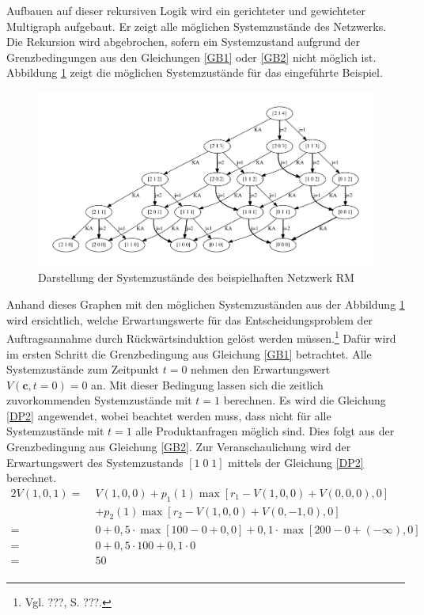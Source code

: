 Aufbauen auf dieser rekursiven Logik wird ein gerichteter und gewichteter Multigraph aufgebaut. Er zeigt alle möglichen Systemzustände des Netzwerks. Die Rekursion wird abgebrochen, sofern ein Systemzustand aufgrund der Grenzbedingungen aus den Gleichungen \eqref{GB1} oder \eqref{GB2} nicht möglich ist. Abbildung \ref{B1} zeigt die möglichen Systemzustände für das eingeführte Beispiel.
\begin{figure}[h!]
  \begin{center}
    \includegraphics[width=150mm]{Bilder/Beispiel1.pdf}
    \caption{Darstellung der Systemzustände des beispielhaften Netzwerk RM}  \label{B1}
  \end{center}
\end{figure}

Anhand dieses Graphen mit den möglichen Systemzuständen aus der Abbildung \ref{B1} wird ersichtlich, welche Erwartungswerte für das Entscheidungsproblem der Auftragsannahme durch Rückwärtsinduktion gelöst werden müssen.\footnote{Vgl. ???, S. ???.} Dafür wird im ersten Schritt die Grenzbedingung aus Gleichung \eqref{GB1} betrachtet. Alle Systemzustände zum Zeitpunkt $t=0$ nehmen den Erwartungswert $V(\textbf{c}, t=0)=0$ an. Mit dieser Bedingung lassen sich die zeitlich zuvorkommenden Systemzustände mit $t=1$ berechnen. Es wird die Gleichung \eqref{DP2} angewendet, wobei beachtet werden muss, dass nicht für alle Systemzustände mit $t=1$ alle Produktanfragen möglich sind. Dies folgt aus der Grenzbedingung aus Gleichung \eqref{GB2}. Zur Veranschaulichung wird der Erwartungswert des Systemzustands $[1\;0\;1]$ mittels der Gleichung \eqref{DP2} berechnet.
\begin{alignat*}{2}
V(1,0,1)=\;&V(1,0,0)+p_{1}(1)\max[r_{1}-V(1,0,0)+V(0,0,0),0]\\
&+p_{2}(1)\max[r_{2}-V(1,0,0)+V(0,-1,0),0]\\
=\;&0+0,5\cdot\max[100-0+0,0]+0,1\cdot\max[200-0+(-\infty),0]\\
=\;&0+0,5\cdot 100+0,1\cdot0\\
=\;&50\\
\end{alignat*}

